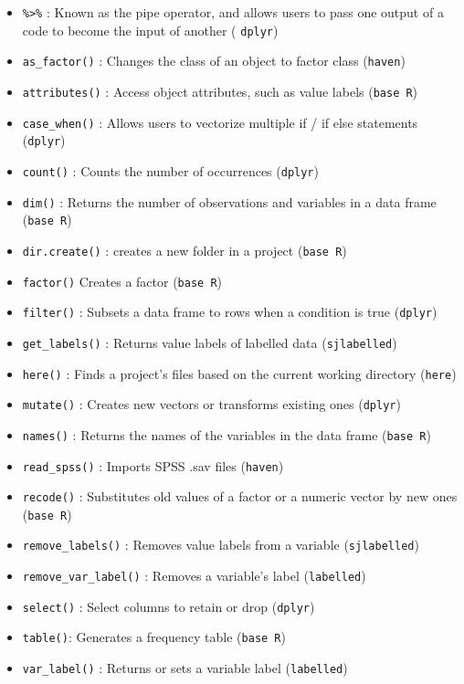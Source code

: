 \documentclass[
]{book}
\providecommand{\tightlist}{%
  \setlength{\itemsep}{0pt}\setlength{\parskip}{0pt}}
\begin{document}
\begin{itemize}
\tightlist
\item
  \texttt{\%\textgreater{}\%} : Known as the pipe operator, and allows users to pass one output of a code to become the input of another ( \texttt{dplyr})
\item
  \texttt{as\_factor()} : Changes the class of an object to factor class (\texttt{haven})
\item
  \texttt{attributes()} : Access object attributes, such as value labels (\texttt{base\ R})
\item
  \texttt{case\_when()} : Allows users to vectorize multiple if / if else statements (\texttt{dplyr})
\item
  \texttt{count()} : Counts the number of occurrences (\texttt{dplyr})
\item
  \texttt{dim()} : Returns the number of observations and variables in a data frame (\texttt{base\ R})
\item
  \texttt{dir.create()} : creates a new folder in a project (\texttt{base\ R})
\item
  \texttt{factor()} Creates a factor (\texttt{base\ R})
\item
  \texttt{filter()} : Subsets a data frame to rows when a condition is true (\texttt{dplyr})
\item
  \texttt{get\_labels()} : Returns value labels of labelled data (\texttt{sjlabelled})
\item
  \texttt{here()} : Finds a project's files based on the current working directory (\texttt{here})
\item
  \texttt{mutate()} : Creates new vectors or transforms existing ones (\texttt{dplyr})
\item
  \texttt{names()} : Returns the names of the variables in the data frame (\texttt{base\ R})
\item
  \texttt{read\_spss()} : Imports SPSS .sav files (\texttt{haven})
\item
  \texttt{recode()} : Substitutes old values of a factor or a numeric vector by new ones (\texttt{base\ R})
\item
  \texttt{remove\_labels()} : Removes value labels from a variable (\texttt{sjlabelled})
\item
  \texttt{remove\_var\_label()} : Removes a variable's label (\texttt{labelled})
\item
  \texttt{select()} : Select columns to retain or drop (\texttt{dplyr})
\item
  \texttt{table()}: Generates a frequency table (\texttt{base\ R})
\item
  \texttt{var\_label()} : Returns or sets a variable label (\texttt{labelled})
\end{itemize}
\end{document}
